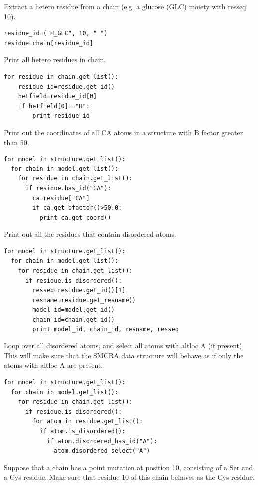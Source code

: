 \documentclass{report}
\begin{document}
Extract a hetero residue from a chain (e.g. a glucose (GLC) moiety with resseq
10).

\begin{verbatim}
residue_id=("H_GLC", 10, " ")
residue=chain[residue_id]
\end{verbatim}

Print all hetero residues in chain.

\begin{verbatim}
for residue in chain.get_list():
	residue_id=residue.get_id()
	hetfield=residue_id[0]
	if hetfield[0]=="H":
		print residue_id
\end{verbatim}

Print out the coordinates of all CA atoms in a structure with B factor greater
than 50.

\begin{verbatim}
for model in structure.get_list():
  for chain in model.get_list():
    for residue in chain.get_list():
      if residue.has_id("CA"):
        ca=residue["CA"]
        if ca.get_bfactor()>50.0:
          print ca.get_coord()
\end{verbatim}

Print out all the residues that contain disordered atoms.

\begin{verbatim}
for model in structure.get_list():
  for chain in model.get_list():
    for residue in chain.get_list():
      if residue.is_disordered():
        resseq=residue.get_id()[1]
        resname=residue.get_resname()
        model_id=model.get_id()
        chain_id=chain.get_id()
        print model_id, chain_id, resname, resseq
\end{verbatim}

Loop over all disordered atoms, and select all atoms with altloc A (if present).
This will make sure that the SMCRA data structure will behave as if only the
atoms with altloc A are present.

\begin{verbatim}
for model in structure.get_list():
  for chain in model.get_list():
    for residue in chain.get_list():
      if residue.is_disordered():
        for atom in residue.get_list():
          if atom.is_disordered():
            if atom.disordered_has_id("A"):
              atom.disordered_select("A")
\end{verbatim}

Suppose that a chain has a point mutation at position 10, consisting of a Ser
and a Cys residue. Make sure that residue 10 of this chain behaves as the Cys
residue.
\end{document}
